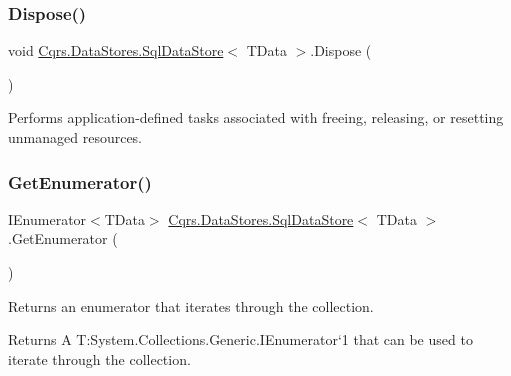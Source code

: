 \subsubsection{\texorpdfstring{Dispose()}{Dispose()}}
{\footnotesize\ttfamily void \hyperlink{classCqrs_1_1DataStores_1_1SqlDataStore}{Cqrs.\+Data\+Stores.\+Sql\+Data\+Store}$<$ T\+Data $>$.Dispose (\begin{DoxyParamCaption}{ }\end{DoxyParamCaption})}



Performs application-\/defined tasks associated with freeing, releasing, or resetting unmanaged resources. 

\mbox{\label{classCqrs_1_1DataStores_1_1SqlDataStore_a774a0a12d6a89479cf25191916f51c47_a774a0a12d6a89479cf25191916f51c47}} 
\subsubsection{\texorpdfstring{Get\+Enumerator()}{GetEnumerator()}}
{\footnotesize\ttfamily I\+Enumerator$<$T\+Data$>$ \hyperlink{classCqrs_1_1DataStores_1_1SqlDataStore}{Cqrs.\+Data\+Stores.\+Sql\+Data\+Store}$<$ T\+Data $>$.Get\+Enumerator (\begin{DoxyParamCaption}{ }\end{DoxyParamCaption})}



Returns an enumerator that iterates through the collection. 

\begin{DoxyReturn}{Returns}
A T\+:\+System.\+Collections.\+Generic.\+I\+Enumerator`1 that can be used to iterate through the collection. 
\end{DoxyReturn}
\mbox{\label{classCqrs_1_1DataStores_1_1SqlDataStore_a091f7762de79cb2d488c2baafbb71476_a091f7762de79cb2d488c2baafbb71476}} 
